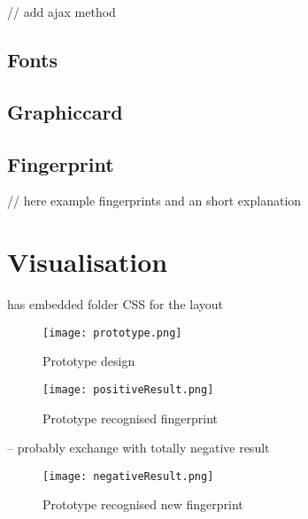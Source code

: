 // add ajax method

\subsection{Fonts}

\subsection{Graphiccard}


\subsection{Fingerprint}

// here example fingerprints and an short explanation


\section{Visualisation}


has embedded folder CSS for the layout

\begin{figure}[H]
	\centering
	\texttt{[image: prototype.png]}
	\caption{Prototype design\\}
	\label{PrototypeDesign}
\end{figure}

\begin{figure}[H]
	\centering
	\texttt{[image: positiveResult.png]}
	\caption{Prototype recognised fingerprint\\}
	\label{PositivePrototypeResult}
\end{figure}

-- probably exchange with totally negative result
\begin{figure}[H]
	\centering
	\texttt{[image: negativeResult.png]}
	\caption{Prototype recognised new fingerprint\\}
	\label{NegativePrototypeResult}
\end{figure}